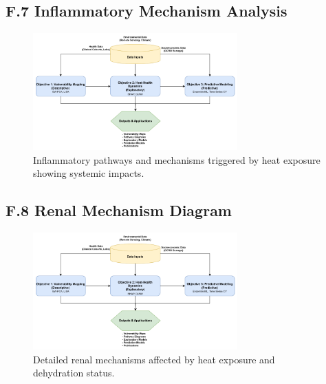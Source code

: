\documentclass[12pt,a4paper,landscape]{article}
\begin{document}
\subsection*{F.7 Inflammatory Mechanism Analysis}
\begin{figure}[H]
    \centering
    \includegraphics[width=0.7\textwidth]{images/AnalyticalFW.png}
    \caption{Inflammatory pathways and mechanisms triggered by heat exposure showing systemic impacts.}
    \label{fig:inflammatory}
\end{figure}

\subsection*{F.8 Renal Mechanism Diagram}
\begin{figure}[H]
    \centering
    \includegraphics[width=0.7\textwidth]{images/AnalyticalFW.png}
    \caption{Detailed renal mechanisms affected by heat exposure and dehydration status.}
    \label{fig:renal}
\end{figure}
\end{document}

